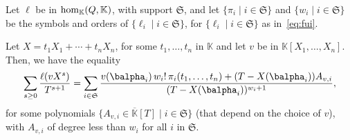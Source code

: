 \documentclass[12pt]{article}
\newcommand{\lf}{X}
\def\K{\mathbb{K}}
\def\K {\ensuremath{\mathbb{K}}}
\def\Kbar {{\ensuremath{\overline{\mathbb{K}}}}}
\begin{document}
\begin{lemma}\label{lemma:formula}
  Let $\ell$ be in ${\rm hom}_\K(Q,\K)$, with support $\mathfrak{S}$,
  and let $\{\pi_i \mid i \in \mathfrak{S}\}$ and $\{w_i \mid i \in
  \mathfrak{S}\}$ be the symbols and orders of $\{\ell_i \mid i \in \mathfrak{S}\}$,
  for $\{\ell_i \mid i \in \mathfrak{S}\}$ as in~\eqref{eq:fui}.
	
  Let $\lf=t_1 X_1 + \cdots +t_n X_n$, for some $t_1,\dots,t_n$ in $\K$
  and let $v$ be in $\K[X_1,\dots,X_n]$. Then, we have the equality
  \begin{align}\label{eq:sumgenseries}
    \sum_{s \ge 0} \frac{\ell(v \lf^s)}{T^{s+1}} = \sum_{i \in \mathfrak{S}}
    \frac{ v(\balpha_i)\, w_i!\, \pi_{i}(t_1,\dots,t_n) +
      (T-\lf(\balpha_i))A_{v,i}} {(T-\lf(\balpha_i))^{w_{i}+1}},
  \end{align}
  for some polynomials $\{A_{v,i} \in \Kbar[T] \mid i \in \mathfrak{S}\}$ (that
  depend on the choice of $v$), with $A_{v,i}$ of degree less than $w_i$ for all $i$ in
  $\mathfrak{S}$.
\end{lemma}
\end{document}
